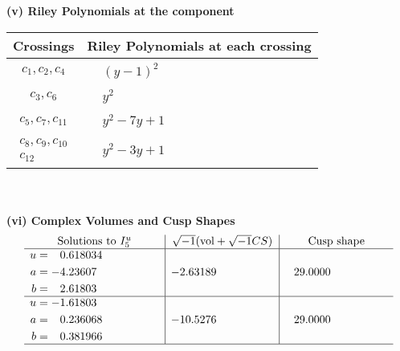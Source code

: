 \documentclass[1p]{elsarticle_modified}
\theoremstyle{definition}
\newcommand{\I}{\sqrt{-1}}
\begin{document}
\newpage\renewcommand{\arraystretch}{1}
\flushleft \textbf{(v) Riley Polynomials at the component}\newline \\
\begin{tabular}{m{50pt}|m{274pt}}
Crossings & \hspace{64pt}Riley Polynomials at each crossing \\
\hline $$\begin{aligned}c_{1},c_{2},c_{4}\end{aligned}$$&$\begin{aligned}
&(y-1)^2
\end{aligned}$\\
\hline $$\begin{aligned}c_{3},c_{6}\end{aligned}$$&$\begin{aligned}
&y^2
\end{aligned}$\\
\hline $$\begin{aligned}c_{5},c_{7},c_{11}\end{aligned}$$&$\begin{aligned}
&y^2-7 y+1
\end{aligned}$\\
\hline $$\begin{aligned}c_{8},c_{9},c_{10}\\c_{12}\end{aligned}$$&$\begin{aligned}
&y^2-3 y+1
\end{aligned}$\\
\hline
\end{tabular}\\~\\
\newpage\flushleft \textbf{(vi) Complex Volumes and Cusp Shapes}
$$\begin{array}{c|c|c}  
\text{Solutions to }I^u_{5}& \I (\text{vol} + \sqrt{-1}CS) & \text{Cusp shape}\\
 \hline 
\begin{aligned}
u &= \phantom{-}0.618034\phantom{ +0.000000I} \\
a &= -4.23607\phantom{ +0.000000I} \\
b &= \phantom{-}2.61803\phantom{ +0.000000I}\end{aligned}
 & -2.63189\phantom{ +0.000000I} & \phantom{-}29.0000\phantom{ +0.000000I} \\ \hline\begin{aligned}
u &= -1.61803\phantom{ +0.000000I} \\
a &= \phantom{-}0.236068\phantom{ +0.000000I} \\
b &= \phantom{-}0.381966\phantom{ +0.000000I}\end{aligned}
 & -10.5276\phantom{ +0.000000I} & \phantom{-}29.0000\phantom{ +0.000000I}\\
 \hline 
 \end{array}$$\newpage\newpage\renewcommand{\arraystretch}{1}
\end{document}
